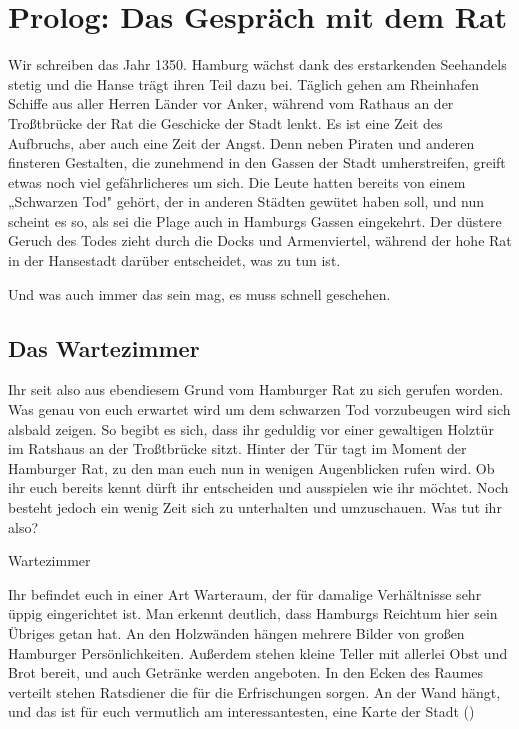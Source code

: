 
\chapter{Prolog: Das Gespräch mit dem Rat}
\label{adventure}

\begin{advquote}
\large Wir schreiben das Jahr 1350. Hamburg wächst dank des erstarkenden Seehandels
stetig und die Hanse trägt ihren Teil dazu bei. Täglich gehen am Rheinhafen Schiffe
aus aller Herren Länder vor Anker, während vom Rathaus an der Troßtbrücke der Rat die
Geschicke der Stadt lenkt. Es ist eine Zeit des Aufbruchs, aber auch eine Zeit der
Angst. Denn neben Piraten und anderen finsteren Gestalten, die zunehmend in den
Gassen der Stadt umherstreifen, greift etwas noch viel gefährlicheres um sich. Die
Leute hatten bereits von einem „Schwarzen Tod" gehört, der in anderen Städten gewütet
haben soll, und nun scheint es so, als sei die Plage auch in Hamburgs Gassen
eingekehrt. Der düstere Geruch des Todes zieht durch die Docks und Armenviertel,
während der hohe Rat in der Hansestadt darüber entscheidet, was zu tun ist.

Und was auch immer das sein mag, es muss schnell geschehen.
\end{advquote}

\section*{Das Wartezimmer}
\label{sec:wartezimmer}

Ihr seit also aus ebendiesem Grund vom Hamburger Rat zu sich gerufen worden. Was
genau von euch erwartet wird um dem schwarzen Tod vorzubeugen wird sich alsbald
zeigen. So begibt es sich, dass ihr geduldig vor einer gewaltigen Holztür im Ratshaus
an der Troßtbrücke sitzt. Hinter der Tür tagt im Moment der Hamburger Rat, zu den
man euch nun in wenigen Augenblicken rufen wird. Ob ihr euch bereits kennt dürft ihr
entscheiden und ausspielen wie ihr möchtet. Noch besteht jedoch ein wenig Zeit sich
zu unterhalten und umzuschauen. Was tut ihr also?

\begin{place-box}{Wartezimmer}

Ihr befindet euch in einer Art Warteraum, der für damalige Verhältnisse sehr üppig
eingerichtet ist. Man erkennt deutlich, dass Hamburgs Reichtum hier sein Übriges
getan hat. An den Holzwänden hängen mehrere Bilder von großen Hamburger 
Persönlichkeiten. Außerdem stehen kleine Teller mit allerlei Obst und Brot bereit, 
und auch Getränke werden angeboten. In den Ecken des Raumes verteilt stehen 
Ratsdiener die für die Erfrischungen sorgen. An der Wand hängt, und das ist für euch
vermutlich am interessantesten, eine Karte der Stadt (\then {})

\end{place-box}

